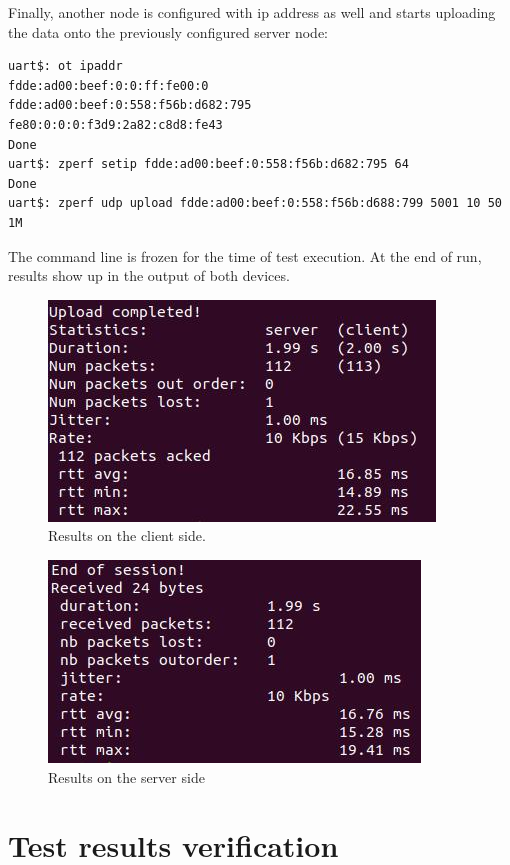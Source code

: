 Finally, another node is configured with ip address as well and starts 
uploading the data onto the previously configured server node:
\begin{lstlisting}
uart$: ot ipaddr
fdde:ad00:beef:0:0:ff:fe00:0
fdde:ad00:beef:0:558:f56b:d682:795
fe80:0:0:0:f3d9:2a82:c8d8:fe43
Done
uart$: zperf setip fdde:ad00:beef:0:558:f56b:d682:795 64
Done
uart$: zperf udp upload fdde:ad00:beef:0:558:f56b:d688:799 5001 10 50 1M
\end{lstlisting}

The command line is frozen for the time of test execution. At the end of
run, results show up in the output of both devices.

\begin{figure}[H]
    \centering
    \includegraphics[]{images/zperf-client.jpg}
    \caption{Results on the client side.}
    \label{fig:zperf_client_results}
\end{figure}

\begin{figure}[H]
    \centering
    \includegraphics[]{images/zperf-server.jpg}
    \caption{Results on the server side}
    \label{fig:zperf_server_results}
\end{figure}

\medskip
\section{Test results verification}
\label{sec:test-results-verification}

